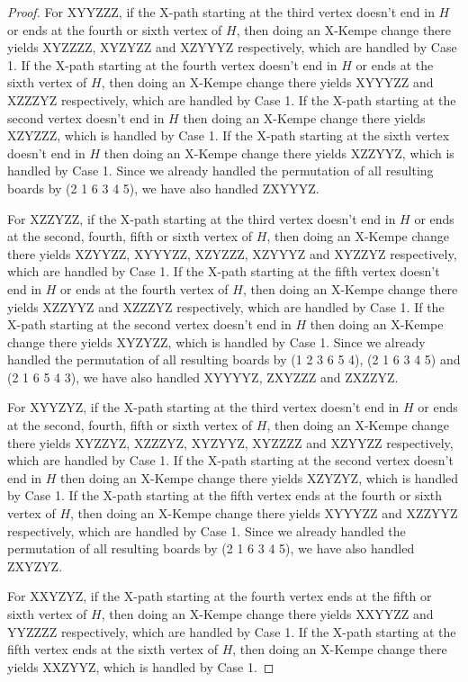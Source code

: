 \documentclass[12pt]{article}
\theoremstyle{plain}
\theoremstyle{definition}
\theoremstyle{remark}
\begin{document}
\begin{proof}
	
	For XYYZZZ, if the X-path starting at the third vertex doesn't end in $H$ or ends at the fourth or sixth vertex of $H$, then doing an X-Kempe change there yields XYZZZZ, XYZYZZ and XZYYYZ respectively, which are handled by Case 1.
	If the X-path starting at the fourth vertex doesn't end in $H$ or ends at the sixth vertex of $H$, then doing an X-Kempe change there yields XYYYZZ and XZZZYZ respectively, which are handled by Case 1.
	If the X-path starting at the second vertex doesn't end in $H$ then doing an X-Kempe change there yields XZYZZZ, which is handled by Case 1.
	If the X-path starting at the sixth vertex doesn't end in $H$ then doing an X-Kempe change there yields XZZYYZ, which is handled by Case 1.
	Since we already handled the permutation of all resulting boards by (2 1 6 3 4 5), we have also handled ZXYYYZ.
	
	
	For XZZYZZ, if the X-path starting at the third vertex doesn't end in $H$ or ends at the second, fourth, fifth or sixth vertex of $H$, then doing an X-Kempe change there yields XZYYZZ, XYYYZZ, XZYZZZ, XZYYYZ and XYZZYZ respectively, which are handled by Case 1.
	If the X-path starting at the fifth vertex doesn't end in $H$ or ends at the fourth vertex of $H$, then doing an X-Kempe change there yields XZZYYZ and XZZZYZ respectively, which are handled by Case 1.
	If the X-path starting at the second vertex doesn't end in $H$ then doing an X-Kempe change there yields XYZYZZ, which is handled by Case 1.
	Since we already handled the permutation of all resulting boards by (1 2 3 6 5 4), (2 1 6 3 4 5) and (2 1 6 5 4 3), we have also handled XYYYYZ, ZXYZZZ and ZXZZYZ.
	
	
	For XYYZYZ, if the X-path starting at the third vertex doesn't end in $H$ or ends at the second, fourth, fifth or sixth vertex of $H$, then doing an X-Kempe change there yields XYZZYZ, XZZZYZ, XYZYYZ, XYZZZZ and XZYYZZ respectively, which are handled by Case 1.
	If the X-path starting at the second vertex doesn't end in $H$ then doing an X-Kempe change there yields XZYZYZ, which is handled by Case 1.
	If the X-path starting at the fifth vertex ends at the fourth or sixth vertex of $H$, then doing an X-Kempe change there yields XYYYZZ and XZZYYZ respectively, which are handled by Case 1.
	Since we already handled the permutation of all resulting boards by (2 1 6 3 4 5), we have also handled ZXYZYZ.
	
	
	For XXYZYZ, if the X-path starting at the fourth vertex ends at the fifth or sixth vertex of $H$, then doing an X-Kempe change there yields XXYYZZ and YYZZZZ respectively, which are handled by Case 1.
	If the X-path starting at the fifth vertex ends at the sixth vertex of $H$, then doing an X-Kempe change there yields XXZYYZ, which is handled by Case 1.
	

\end{proof}
\end{document}
